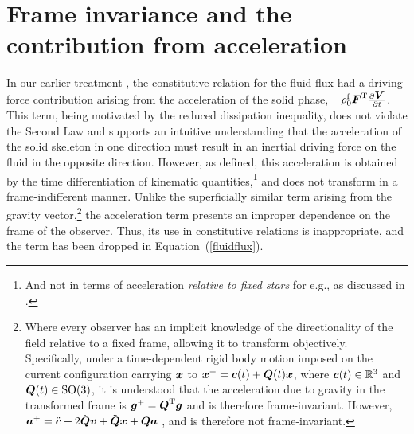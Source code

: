 

\section{Frame invariance and the contribution from acceleration}
\label{acceleration-objectivity}

In our earlier treatment \citep{growthpaper}, the constitutive
relation for the fluid flux had a driving force contribution arising
from the acceleration of the solid phase,
$-\rho_0^\mathrm{f}\mbox{\boldmath$ F$}^{\mathrm{T}}\frac{\partial \mbox{\boldmath$ V$}}{\partial t}$.
This term, being motivated by the reduced dissipation inequality, does
not violate the Second Law and supports an intuitive understanding
that the acceleration of the solid skeleton in one direction must result in
an inertial driving force on the fluid in the opposite
direction. However, as defined, this acceleration is obtained by the
time differentiation of kinematic quantities,\footnote{And not in terms
of acceleration {\em relative to fixed stars} for e.g., as discussed
in \cite[][Page 43]{TruesdellNoll:65}.} and does not transform in a
frame-indifferent manner. Unlike the superficially similar term
arising from the gravity vector,\footnote{Where every observer has an
implicit knowledge of the directionality of the field relative to a
fixed frame, allowing it to transform objectively. Specifically, under
a time-dependent rigid body motion imposed on the current
configuration carrying $\mbox{\boldmath$ x$}$ to $\mbox{\boldmath$ x$}^+ = \mbox{\boldmath$ c$}(t) + \mbox{\boldmath$ Q$}(t)\mbox{\boldmath$ x$}$, where
$\mbox{\boldmath$ c$}(t) \in \mathbb{R}^3$ and $\mbox{\boldmath$ Q$}(t) \in \mbox{SO}(3)$, it is
understood that the acceleration due to gravity in the transformed
frame is $\mbox{\boldmath$ g$}^+ = \mbox{\boldmath$ Q$}^\mathrm{T}\mbox{\boldmath$ g$}$ and is therefore
frame-invariant. However, $\mbox{\boldmath$ a$}^+ = \ddot{\mbox{\boldmath$ c$}} + 2\dot{\mbox{\boldmath$ Q$}}\mbox{\boldmath$ v$} +
\ddot{\mbox{\boldmath$ Q$}}\mbox{\boldmath$ x$} + \mbox{\boldmath$ Q$}\mbox{\boldmath$ a$}$ , and is therefore not frame-invariant.} the
acceleration 
term presents an improper dependence on the frame of the
observer. Thus, its use in constitutive relations is inappropriate,
and the term has been dropped in \mbox{Equation (\ref{fluidflux})}.

